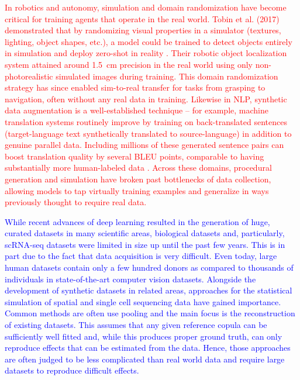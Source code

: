 \documentclass{article}
\newcommand{\phflo}[1]{\textcolor{blue}{#1}}
\newcommand{\gpt}[1]{\textcolor{red}{#1}}
\begin{document}
\gpt{ In robotics and autonomy, simulation and domain randomization have become critical for training agents that operate in the real world. Tobin et al. (2017) demonstrated that by randomizing visual properties in a simulator (textures, lighting, object shapes, etc.), a model could be trained to detect objects entirely in simulation and deploy zero-shot in reality \cite{tobin2017domain}. Their robotic object localization system attained around \SI{1.5}{\centi\metre} precision in the real world using only non-photorealistic simulated images during training. This domain randomization strategy has since enabled sim-to-real transfer for tasks from grasping to navigation, often without any real data in training. Likewise in NLP, synthetic data augmentation is a well-established technique -- for example, machine translation systems routinely improve by training on back-translated sentences (target-language text synthetically translated to source-language) in addition to genuine parallel data. Including millions of these generated sentence pairs can boost translation quality by several BLEU points, comparable to having substantially more human-labeled data \cite{sennrich-etal-2016-improving,edunov-etal-2018-understanding,mcnamee-duh-2023-extensive,reheman-etal-2024-exploiting}.
Across these domains, procedural generation and simulation have broken past bottlenecks of data collection, allowing models to tap virtually   training examples and generalize in ways previously thought to require real data.}

\phflo{
While recent advances of deep learning resulted in the generation of huge, curated datasets in many scientific areas, biological datasets and, particularly, scRNA-seq datasets were limited in size up until the past few years. This is in part due to the fact that data acquisition is very difficult. Even today, large human datasets contain only a few hundred donors as compared to thousands of individuals in state-of-the-art computer vision datasets. Alongside the development of synthetic datasets in related areas, approaches for the statistical simulation of spatial and single cell sequencing data have gained importance. 
Common methods are often use pooling and the main focus is the reconstruction of existing datasets. This assumes that any given reference copula can be sufficiently well fitted and, while this produces proper ground truth, can only reproduce effects that can be estimated from the data. Hence, those approaches are often judged to be less complicated than real world data and require large datasets to reproduce difficult effects. }
\end{document}
